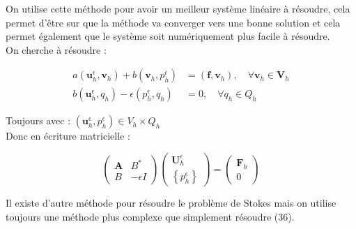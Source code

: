 On utilise cette méthode pour avoir un meilleur système linéaire à résoudre, cela permet d'être sur que la méthode va converger vers une bonne solution et cela permet également que le système soit numériquement plus facile à résoudre.\\


On cherche à résoudre : 

\begin{equation}
\begin{aligned}
a\left(\mathbf{u}_{h}^{\epsilon}, \mathbf{v}_{h}\right)+b\left(\mathbf{v}_{h}, p_{h}^{\epsilon}\right) &=\left(\mathbf{f}, \mathbf{v}_{h}\right), \quad \forall \mathbf{v}_{h} \in \mathbf{V}_{h} \\
b\left(\mathbf{u}_{h}^{\epsilon}, q_{h}\right)-\epsilon\left(p_{h}^{\epsilon}, q_{h}\right) &=0, \quad \forall q_{h} \in Q_{h}
\end{aligned}
\end{equation}

Toujours avec : $(\mathbf{u}_{h}^{\epsilon}, p_{h}^{\epsilon}) \in V_h \times Q_h$\\


Donc en écriture matricielle : 

\begin{equation}
\left(\begin{array}{cc}
\mathbf{A} & B^{*} \\
B & -\epsilon I
\end{array}\right)\left(\begin{array}{c}
\mathbf{U}_{h}^{\epsilon} \\
\left\{p_{h}^{\epsilon}\right\}
\end{array}\right)=\left(\begin{array}{c}
\mathbf{F}_{h} \\
0
\end{array}\right)
\end{equation}

Il existe d'autre méthode pour résoudre le problème de Stokes mais on utilise toujours une méthode plus complexe que simplement résoudre (36).